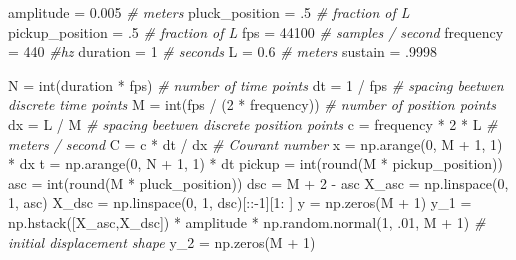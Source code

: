 \documentclass[]{article}
\newenvironment{Shaded}{}{}
\newcommand{\BuiltInTok}[1]{#1}
\newcommand{\CommentTok}[1]{\textcolor[rgb]{0.38,0.63,0.69}{\textit{#1}}}
\newcommand{\DecValTok}[1]{\textcolor[rgb]{0.25,0.63,0.44}{#1}}
\newcommand{\FloatTok}[1]{\textcolor[rgb]{0.25,0.63,0.44}{#1}}
\newcommand{\NormalTok}[1]{#1}
\newcommand{\OperatorTok}[1]{\textcolor[rgb]{0.40,0.40,0.40}{#1}}
\begin{document}
\begin{Shaded}
\begin{Highlighting}[numbers=left,,]
\NormalTok{amplitude }\OperatorTok{=} \FloatTok{0.005} \CommentTok{# meters}
\NormalTok{pluck_position }\OperatorTok{=} \FloatTok{.5} \CommentTok{# fraction of L}
\NormalTok{pickup_position }\OperatorTok{=} \FloatTok{.5} \CommentTok{# fraction of L}
\NormalTok{fps }\OperatorTok{=} \DecValTok{44100} \CommentTok{# samples / second}
\NormalTok{frequency }\OperatorTok{=} \DecValTok{440} \CommentTok{#hz}
\NormalTok{duration }\OperatorTok{=} \DecValTok{1} \CommentTok{# seconds}
\NormalTok{L }\OperatorTok{=} \FloatTok{0.6} \CommentTok{# meters}
\NormalTok{sustain }\OperatorTok{=} \FloatTok{.9998}

\NormalTok{N }\OperatorTok{=} \BuiltInTok{int}\NormalTok{(duration }\OperatorTok{*}\NormalTok{ fps) }\CommentTok{# number of time points}
\NormalTok{dt }\OperatorTok{=} \DecValTok{1} \OperatorTok{/}\NormalTok{ fps }\CommentTok{# spacing beetwen discrete time points}
\NormalTok{M }\OperatorTok{=} \BuiltInTok{int}\NormalTok{(fps }\OperatorTok{/}\NormalTok{ (}\DecValTok{2} \OperatorTok{*}\NormalTok{ frequency)) }\CommentTok{# number of position points}
\NormalTok{dx }\OperatorTok{=}\NormalTok{ L }\OperatorTok{/}\NormalTok{ M }\CommentTok{# spacing beetwen discrete position points}
\NormalTok{c }\OperatorTok{=}\NormalTok{ frequency }\OperatorTok{*} \DecValTok{2} \OperatorTok{*}\NormalTok{ L }\CommentTok{# meters / second}
\NormalTok{C }\OperatorTok{=}\NormalTok{ c }\OperatorTok{*}\NormalTok{ dt }\OperatorTok{/}\NormalTok{ dx }\CommentTok{# Courant number}
\NormalTok{x }\OperatorTok{=}\NormalTok{ np.arange(}\DecValTok{0}\NormalTok{, M }\OperatorTok{+} \DecValTok{1}\NormalTok{, }\DecValTok{1}\NormalTok{) }\OperatorTok{*}\NormalTok{ dx}
\NormalTok{t }\OperatorTok{=}\NormalTok{ np.arange(}\DecValTok{0}\NormalTok{, N }\OperatorTok{+} \DecValTok{1}\NormalTok{, }\DecValTok{1}\NormalTok{) }\OperatorTok{*}\NormalTok{ dt}
\NormalTok{pickup }\OperatorTok{=} \BuiltInTok{int}\NormalTok{(}\BuiltInTok{round}\NormalTok{(M }\OperatorTok{*}\NormalTok{ pickup_position))}
\NormalTok{asc }\OperatorTok{=} \BuiltInTok{int}\NormalTok{(}\BuiltInTok{round}\NormalTok{(M }\OperatorTok{*}\NormalTok{ pluck_position))}
\NormalTok{dsc }\OperatorTok{=}\NormalTok{ M }\OperatorTok{+} \DecValTok{2} \OperatorTok{-}\NormalTok{ asc}
\NormalTok{X_asc }\OperatorTok{=}\NormalTok{ np.linspace(}\DecValTok{0}\NormalTok{, }\DecValTok{1}\NormalTok{, asc)}
\NormalTok{X_dsc }\OperatorTok{=}\NormalTok{ np.linspace(}\DecValTok{0}\NormalTok{, }\DecValTok{1}\NormalTok{, dsc)[::}\OperatorTok{-}\DecValTok{1}\NormalTok{][}\DecValTok{1}\NormalTok{: ]}
\NormalTok{y }\OperatorTok{=}\NormalTok{ np.zeros(M }\OperatorTok{+} \DecValTok{1}\NormalTok{)}
\NormalTok{y_1 }\OperatorTok{=}\NormalTok{ np.hstack([X_asc,X_dsc]) }\OperatorTok{*}\NormalTok{ amplitude }\OperatorTok{*}\NormalTok{ np.random.normal(}\DecValTok{1}\NormalTok{, }\FloatTok{.01}\NormalTok{, M }\OperatorTok{+} \DecValTok{1}\NormalTok{) }\CommentTok{# initial displacement shape}
\NormalTok{y_2 }\OperatorTok{=}\NormalTok{ np.zeros(M }\OperatorTok{+} \DecValTok{1}\NormalTok{)}


\end{Highlighting}
\end{Shaded}
\end{document}

